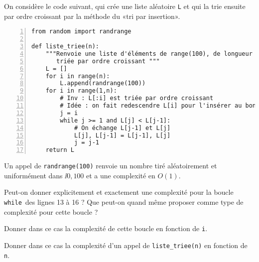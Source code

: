 On considère le code suivant, qui crée une liste aléatoire \texttt L et qui la trie ensuite par ordre croissant par la méthode du «tri par insertion». 
\begin{Verbatim}[gobble=0,numbers=left]
from random import randrange

def liste_triee(n):
    """Renvoie une liste d'éléments de range(100), de longueur n,
       triée par ordre croissant """
    L = []
    for i in range(n):
        L.append(randrange(100))
    for i in range(1,n):
        # Inv : L[:i] est triée par ordre croissant
        # Idée : on fait redescendre L[i] pour l'insérer au bon endroit
        j = i
        while j >= 1 and L[j] < L[j-1]:
            # On échange L[j-1] et L[j]
            L[j], L[j-1] = L[j-1], L[j]
            j = j-1
    return L
\end{Verbatim}
Un appel de \texttt{randrange(100)} renvoie un nombre tiré aléatoirement et uniformément dans $\ii{0,100}$ et a une complexité en $O(1)$. 

\medskip{}

\question{} Peut-on donner explicitement et exactement une complexité pour la boucle \texttt{while} des lignes 13 à 16 ? 
Que peut-on quand même proposer comme type de complexité pour cette boucle ? 

Donner dans ce cas la complexité de cette boucle en fonction de \texttt{i}. 

\question{} Donner dans ce cas la complexité d'un appel de \texttt{liste\_triee(n)} en fonction de \texttt n. 
